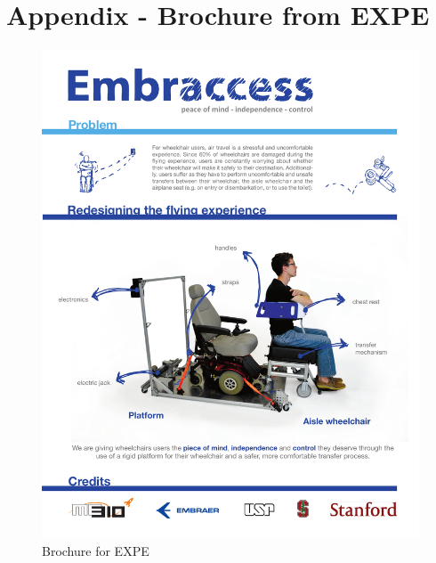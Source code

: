 \chapter{Appendix - Brochure from EXPE}

\begin{figure}[h!]
	\centering
		\includegraphics[width=1\textwidth, page=1]{Figures/Brochure.pdf}
		\caption{Brochure for EXPE}
		\label{fig:brochure}
\end{figure}
